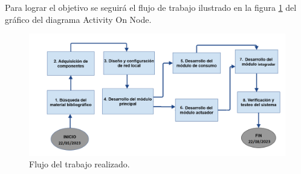 \documentclass[a4paper, 12pt]{article}
\begin{document}
\vskip 0.2cm 
Para lograr el objetivo se seguirá el flujo de trabajo ilustrado en la figura \ref{fig:diagrama} del gráfico del diagrama Activity On Node.

\begin{figure}[ht]
\begin{center}
\includegraphics[width=1.0\textwidth]{AoN}
\end{center}
\begin{center}
\vskip -0.5cm
\caption{\small{Flujo del trabajo realizado.}}
\label{fig:diagrama}
\end{center}
\end{figure}
\end{document}
